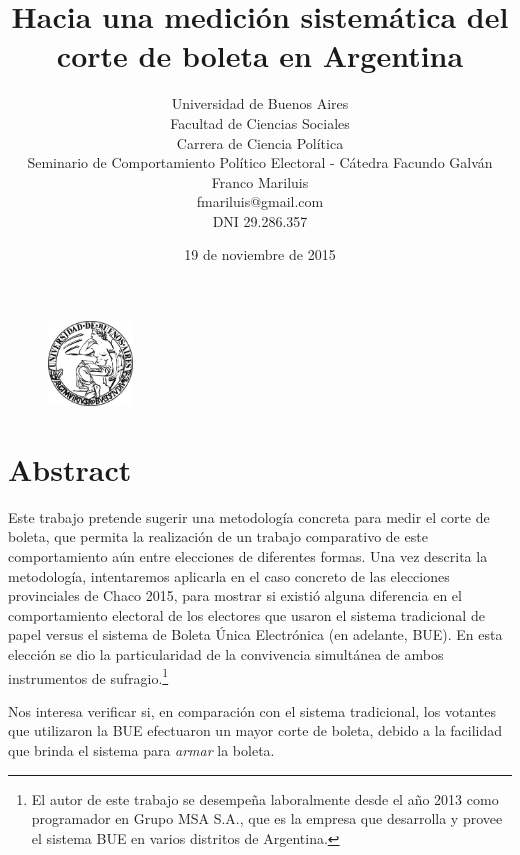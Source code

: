 \documentclass[12pt,a4paper]{article}
\begin{document}
 \begin{figure}[h!]
   \centering
   \includegraphics[width=0.20\textwidth]{uba_logo}~\\[1cm]
\title{Hacia una medición sistemática del corte de boleta en Argentina}
\author{
  Universidad de Buenos Aires\\
  Facultad de Ciencias Sociales\\
    Carrera de Ciencia Política \\
    Seminario de Comportamiento Político Electoral - Cátedra Facundo Galván\\
  Franco Mariluis\\
  fmariluis@gmail.com\\
  DNI 29.286.357\\
}
\date{19 de noviembre de 2015}
\maketitle
 \end{figure}

\pagebreak 

\section{Abstract}
Este trabajo pretende sugerir una metodología concreta para medir el corte de
boleta, que permita la realización de un trabajo comparativo de este
comportamiento aún entre elecciones de
diferentes formas.
Una vez descrita la metodología, intentaremos aplicarla en el caso concreto de
las elecciones provinciales de Chaco 2015, para mostrar si existió alguna
diferencia en el comportamiento electoral de los electores que usaron el sistema
tradicional de papel versus el sistema de Boleta Única Electrónica (en adelante,
BUE). 
En esta elección se dio la particularidad de la convivencia simultánea de ambos
instrumentos de sufragio.\footnote{El autor de
este trabajo se desempeña laboralmente desde el año 2013 como programador en Grupo MSA S.A., que
es la empresa que desarrolla y provee el sistema BUE en varios distritos de Argentina.}

Nos interesa verificar si, en comparación con el sistema tradicional, los
votantes que utilizaron la BUE efectuaron un mayor corte de boleta, debido a la
facilidad que brinda el sistema para \emph{armar} la boleta.
\end{document}
